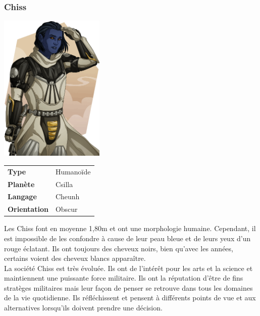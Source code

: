 \subsubsection{Chiss}
\begin{samepage}
	\includegraphics[width=5cm]{img/personnages/races/chiss.png}

	\vspace{-9\baselineskip}

	\begin{flushright}
		\begin{tabular}{ l l }
			\textbf{Type} 			& Humanoïde \\
		   	\textbf{Planète} 		& Csilla \\
		   	\textbf{Langage} 		& Cheunh \\
		   	\textbf{Orientation} 	& Obscur \\
		\end{tabular}
	\end{flushright}
	\vspace{4\baselineskip}
\end{samepage}

Les Chiss font en moyenne 1,80m et ont une morphologie humaine. Cependant, il est impossible de les confondre à cause de leur peau bleue et de leurs yeux d’un rouge éclatant. Ils ont toujours des cheveux noirs, bien qu’avec les années, certains voient des cheveux blancs apparaître. \\ 

La société Chiss est très évoluée. Ils ont de l’intérêt pour les arts et la science et maintiennent une puissante force militaire. Ils ont la réputation d’être de fins stratèges militaires mais leur façon de penser se retrouve dans tous les domaines de la vie quotidienne. Ils réfléchissent et pensent à différents points de vue et aux alternatives lorsqu’ils doivent prendre une décision.  


